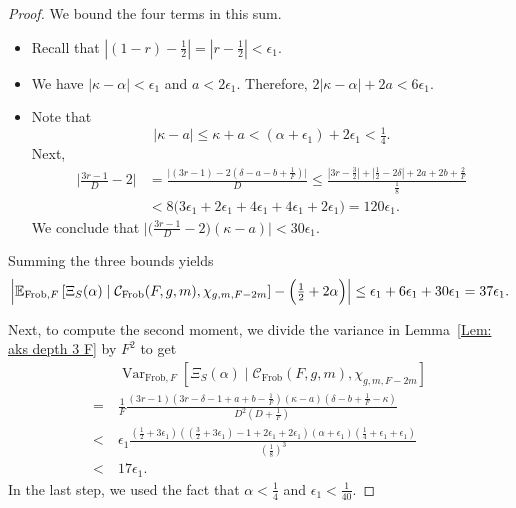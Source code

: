 \documentclass[12pt]{amsart}
\def\E{{\mathbb E}}
\newcommand{\cC}{\mathcal{C}}
\def\Var{{\operatorname{Var}}}
\newcommand{\Frob}{\text{Frob}}
\begin{document}
\begin{proof}
We bound the four terms in this sum.
\begin{itemize}
\item Recall that $|(1-r)-\tfrac12|=|r-\tfrac12|< \epsilon_1$.
\item We have $|\kappa-\alpha|< \epsilon_1$ and $a< 2\epsilon_1$.  Therefore, $2|\kappa-\alpha|+2a< 6\epsilon_1$.
\item Note that
\[
|\kappa-a|\leq \kappa+ a<(\alpha+\epsilon_1) +2\epsilon_1 <\tfrac{1}{4}.
\]
Next,
\begin{align*}
\Big|\tfrac{3r-1}{D}-2\Big|
&=\frac{\big|(3r-1)-2(\delta-a-b+\tfrac1F)\big|}{D}
\leq \frac{|3r-\frac{3}{2}| + |\frac{1}{2} -2\delta|+2a+2b+\tfrac{2}{F}}{\frac{1}{8}}\\
&< 8 \big( 3\epsilon_1 + 2\epsilon_1 +4\epsilon_1+4\epsilon_1+2\epsilon_1\big) =120\epsilon_1.
\end{align*}
We conclude that $\big|\big(\tfrac{3r-1}{D}-2\big)(\kappa-a)\big| < 30\epsilon_1$.
\end{itemize}
Summing the three bounds yields
\[
\Bigl|\E_{\Frob,F}\left[\Xi_S(\alpha)\mid \cC_{\Frob}(F,g,m),  \chi_{g,m,F-2m}\right]-\Big(\tfrac12+2\alpha\Big)\Bigr|
\le \epsilon_1+6\epsilon_1+30\epsilon_1 = 37\epsilon_1.
\]

Next, to compute the second moment, we divide the variance in Lemma~\ref{Lem: aks depth 3 F} by $F^2$ to get
\begin{align*}
&\ \Var_{\Frob,F}[\Xi_S(\alpha) \mid  \cC_{\Frob}(F,g,m), \chi_{g,m,F-2m}] \\
= &\ \frac{1}{F} \frac{(3r-1)(3r -\delta -1 +a+b-\frac{1}{F})(\kappa-a)(\delta-b+\frac{1}{F}-\kappa)}{D^2 (D+\frac{1}{F})}\\
< &\  \epsilon_1 \frac{(\tfrac{1}{2}+3\epsilon_1)((\frac{3}{2}+3\epsilon_1)   -1 +2\epsilon_1+2\epsilon_1)(\alpha+\epsilon_1)(\frac{1}{4}+\epsilon_1+\epsilon_1)}{(\tfrac{1}{8})^3}\\
< &\ 17\epsilon_1.
\end{align*}
In the last step, we used the fact that $\alpha<\frac{1}{4}$ and $\epsilon_1<\frac{1}{40}$.


\end{proof}
\end{document}
